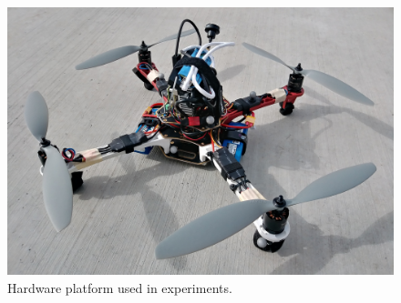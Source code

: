 \begin{figure}
  \centering
  \includegraphics[scale=0.15]{figures/hardware_platform.jpg}
  \caption[Multirotor UAV Used in Experiments]{Hardware platform used in experiments.}
  \label{f:drone_pic}
\end{figure}
